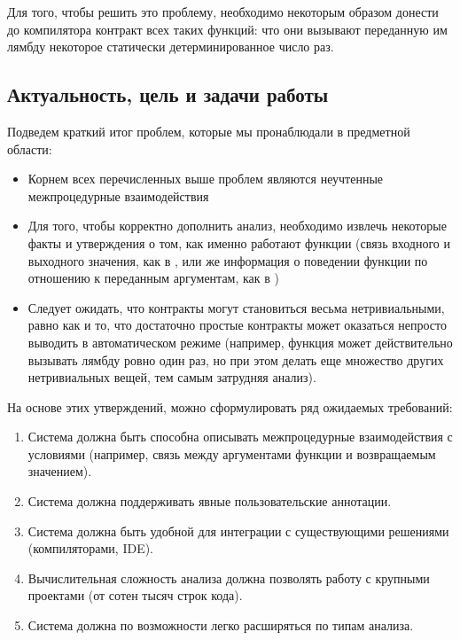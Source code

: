 Для того, чтобы решить это проблему, необходимо некоторым образом донести до компилятора контракт всех таких функций: что они вызывают переданную им лямбду некоторое статически детерминированное число раз.





\subsection{Актуальность, цель и задачи работы}

Подведем краткий итог проблем, которые мы пронаблюдали в предметной области:

\begin{itemize}
    \item Корнем всех перечисленных выше проблем являются неучтенные межпроцедурные взаимодействия

    \item Для того, чтобы корректно дополнить анализ, необходимо извлечь некоторые факты и утверждения о том, как именно работают функции (связь входного и выходного значения, как в , или же информация о поведении функции по отношению к переданным аргументам, как в )

    \item Следует ожидать, что контракты могут становиться весьма нетривиальными, равно как и то, что достаточно простые контракты может оказаться непросто выводить в автоматическом режиме (например, функция может действительно вызывать лямбду ровно один раз, но при этом делать еще множество других нетривиальных вещей, тем самым затрудняя анализ).
\end{itemize}

На основе этих утверждений, можно сформулировать ряд ожидаемых требований:

\begin{enumerate}
  \item Система должна быть способна описывать межпроцедурные взаимодействия с условиями (например, связь между аргументами функции и возвращаемым значением).

  \item Система должна поддерживать явные пользовательские аннотации.

  \item Система должна быть удобной для интеграции с существующими решениями (компиляторами, IDE).

  \item Вычислительная сложность анализа должна позволять работу с крупными проектами (от сотен тысяч строк кода).

  \item Система должна по возможности легко расширяться по типам анализа.
\end{enumerate}


